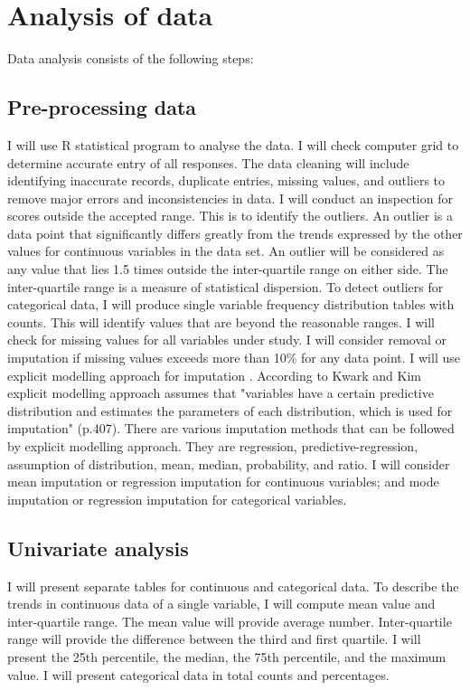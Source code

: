 \section{Analysis of data}

Data analysis consists of the following steps:

\subsection{Pre-processing data}

I will use R statistical program to analyse the data. I will check computer grid to determine accurate entry of all responses. The data cleaning will include identifying inaccurate records, duplicate entries, missing values, and outliers to remove major errors and inconsistencies in data. I will conduct an inspection for scores outside the accepted range. This is to identify the outliers. An outlier is a data point that significantly differs greatly from the trends expressed by the other values for continuous variables in the data set. An outlier will be considered as any value that lies 1.5 times outside the inter-quartile range on either side. The inter-quartile range is a measure of statistical dispersion. To detect outliers for categorical data, I will produce single variable frequency distribution tables with counts. This will identify values that are beyond the reasonable ranges. I will check for missing values for all variables under study. I will consider removal or imputation if missing values exceeds more than 10\% for any data point. I will use explicit modelling approach for imputation \cite{kwak2017statistical}. According to Kwark and Kim \citeyear{kwak2017statistical} explicit modelling approach assumes that "variables have a certain predictive distribution and estimates the parameters of each distribution, which is used for imputation" (p.407). There are various imputation methods that can be followed by explicit modelling approach. They are regression, predictive-regression, assumption of distribution, mean, median, probability, and ratio. I will consider mean imputation or regression imputation for continuous variables; and mode imputation or regression imputation for categorical variables. 
  
\subsection{Univariate analysis}
 
I will present separate tables for continuous and categorical data. To describe the trends in continuous data of a single variable, I will compute mean value and inter-quartile range. The mean value will provide average number. Inter-quartile range will provide the difference between the third and first quartile. I will present the 25th percentile, the median, the 75th percentile, and the maximum value. I will present categorical data in total counts and percentages. 

